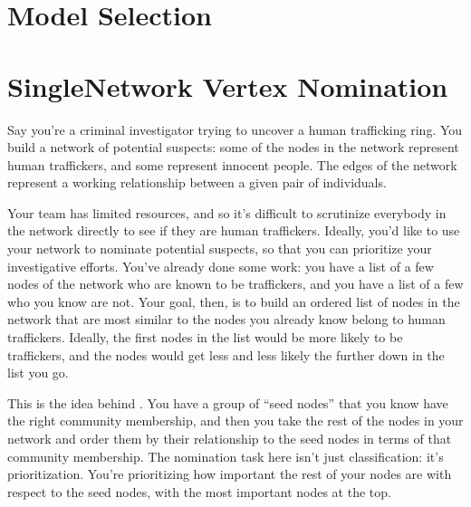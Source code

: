 \documentclass[letterpaper,10pt,english]{jupyterBook}
\begin{document}
\section{Model Selection}
\label{\detokenize{applications/ch8/model-selection:model-selection}}\label{\detokenize{applications/ch8/model-selection::doc}}

\section{Single\sphinxhyphen{}Network Vertex Nomination}
\label{\detokenize{applications/ch8/single-vertex-nomination:single-network-vertex-nomination}}\label{\detokenize{applications/ch8/single-vertex-nomination::doc}}
\sphinxAtStartPar
Say you’re a criminal investigator trying to uncover a human trafficking ring. You build a network of potential suspects: some of the nodes in the network represent human traffickers, and some represent innocent people. The edges of the network represent a working relationship between a given pair of individuals.

\sphinxAtStartPar
Your team has limited resources, and so it’s difficult to scrutinize everybody in the network directly to see if they are human traffickers. Ideally, you’d like to use your network to nominate potential suspects, so that you can prioritize your investigative efforts. You’ve already done some work: you have a list of a few nodes of the network who are known to be traffickers, and you have a list of a few who you know are not. Your goal, then, is to build an ordered list of nodes in the network that are most similar to the nodes you already know belong to human traffickers. Ideally, the first nodes in the list would be more likely to be traffickers, and the nodes would get less and less likely the further down in the list you go.

\sphinxAtStartPar
This is the idea behind . You have a group of “seed nodes” that you know have the right community membership, and then you take the rest of the nodes in your network and order them by their relationship to the seed nodes in terms of that community membership. The nomination task here isn’t just classification: it’s prioritization. You’re prioritizing how important the rest of your nodes are with respect to the seed nodes, with the most important nodes at the top.
\end{document}
